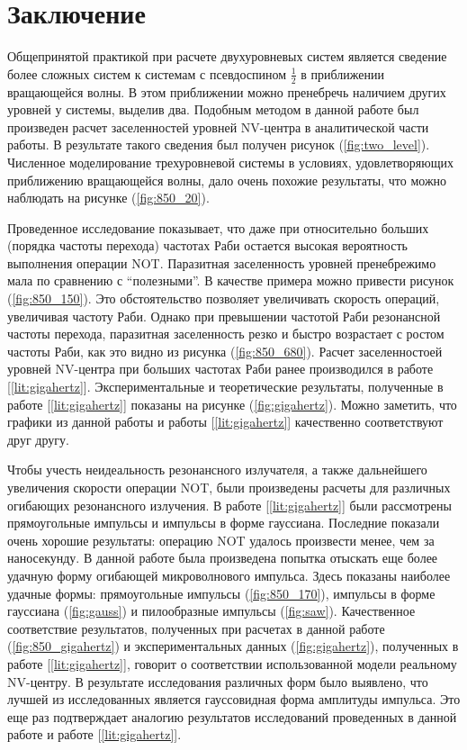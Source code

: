 \newpage
\chapter*{Заключение}
Общепринятой практикой при расчете двухуровневых систем является
сведение более сложных систем к системам с псевдоспином $\frac{1}{2}$
в приближении вращающейся волны. В этом приближении можно пренебречь
наличием других уровней у системы, выделив два. Подобным методом в
данной работе был произведен расчет заселенностей уровней NV-центра в
аналитической части работы. В результате такого сведения был получен
рисунок (\ref{fig:two_level}). Численное моделирование трехуровневой
системы в условиях, удовлетворяющих приближению вращающейся волны,
дало очень похожие результаты, что можно наблюдать на рисунке
(\ref{fig:850_20}).

Проведенное исследование показывает, что даже при относительно больших
(порядка частоты перехода) частотах Раби остается высокая вероятность
выполнения операции NOT. Паразитная заселенность уровней пренебрежимо
мала по сравнению с ``полезными''. В качестве примера можно привести
рисунок (\ref{fig:850_150}). Это обстоятельство позволяет увеличивать
скорость операций, увеличивая частоту Раби. Однако при превышении
частотой Раби резонансной частоты перехода, паразитная заселенность
резко и быстро возрастает с ростом частоты Раби, как это видно из
рисунка (\ref{fig:850_680}). Расчет заселенностоей уровней NV-центра
при больших частотах Раби ранее производился в работе
[\ref{lit:gigahertz}]. Экспериментальные и теоретические результаты,
полученные в работе [\ref{lit:gigahertz}] показаны на рисунке
(\ref{fig:gigahertz}). Можно заметить, что графики из данной работы и
работы [\ref{lit:gigahertz}] качественно соответствуют друг другу.

Чтобы учесть неидеальность резонансного излучателя, а также
дальнейшего увеличения скорости операции NOT, были произведены расчеты
для различных огибающих резонансного излучения. В работе
[\ref{lit:gigahertz}] были рассмотрены прямоугольные импульсы и
импульсы в форме гауссиана. Последние показали очень хорошие
результаты: операцию NOT удалось произвести менее, чем за
наносекунду. В данной работе была произведена попытка отыскать еще
более удачную форму огибающей микроволнового импульса. Здесь
показаны наиболее удачные формы: прямоугольные импульсы (\ref{fig:850_170}), импульсы в
форме гауссиана (\ref{fig:gauss}) и пилообразные импульсы
(\ref{fig:saw}). Качественное соответствие результатов, полученных при
расчетах в данной работе (\ref{fig:850_gigahertz}) и экспериментальных
данных (\ref{fig:gigahertz}), полученных в работе [\ref{lit:gigahertz}],
говорит о соответствии использованной модели реальному NV-центру. В результате
исследования различных форм было выявлено, что лучшей из исследованных
является гауссовидная форма амплитуды импульса. Это еще раз подтверждает
аналогию результатов исследований проведенных в данной работе и работе
[\ref{lit:gigahertz}].



